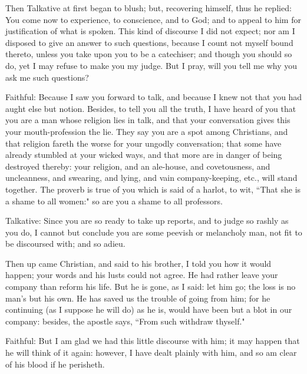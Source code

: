 Then Talkative at first began to blush; but, recovering himself, thus he replied: You come now to experience, to conscience, and to God; and to appeal to him for justification of what is spoken. This kind of discourse I did not expect; nor am I disposed to give an answer to such questions, because I count not myself bound thereto, unless you take upon you to be a catechiser; and though you should so do, yet I may refuse to make you my judge. But I pray, will you tell me why you ask me such questions?

Faithful: Because I saw you forward to talk, and because I knew not that you had aught else but notion. Besides, to tell you all the truth, I have heard of you that you are a man whose religion lies in talk, and that your conversation gives this your mouth-profession the lie. They say you are a spot among Christians, and that religion fareth the worse for your ungodly conversation; that some have already stumbled at your wicked ways, and that more are in danger of being destroyed thereby: your religion, and an ale-house, and covetousness, and uncleanness, and swearing, and lying, and vain company-keeping, etc., will stand together. The proverb is true of you which is said of a harlot, to wit, ``That she is a shame to all women:" so are you a shame to all professors.

Talkative: Since you are so ready to take up reports, and to judge so rashly as you do, I cannot but conclude you are some peevish or melancholy man, not fit to be discoursed with; and so adieu.

Then up came Christian, and said to his brother, I told you how it would happen; your words and his lusts could not agree. He had rather leave your company than reform his life. But he is gone, as I said: let him go; the loss is no man's but his own. He has saved us the trouble of going from him; for he continuing (as I suppose he will do) as he is, would have been but a blot in our company: besides, the apostle says, ``From such withdraw thyself."

Faithful: But I am glad we had this little discourse with him; it may happen that he will think of it again: however, I have dealt plainly with him, and so am clear of his blood if he perisheth.

